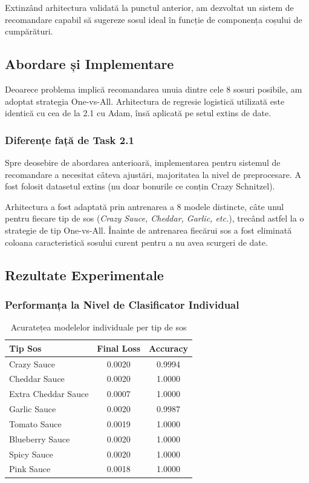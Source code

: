 \documentclass[12pt,a4paper]{article}
\begin{document}
Extinzând arhitectura validată la punctul anterior, am dezvoltat un sistem de recomandare capabil să sugereze sosul ideal în funcție de componența coșului de cumpărături.

\subsection{Abordare și Implementare}

Deoarece problema implică recomandarea unuia dintre cele 8 sosuri posibile, am adoptat strategia One-vs-All. Arhitectura de regresie logistică utilizată este identică cu cea de la 2.1 cu Adam, însă aplicată pe setul extins de date.

\subsubsection*{Diferențe față de Task 2.1}

Spre deosebire de abordarea anterioară, implementarea pentru sistemul de recomandare a necesitat câteva ajustări, majoritatea la nivel de preprocesare. A fost folosit datasetul extins (nu doar bonurile ce conțin Crazy Schnitzel).

Arhitectura a fost adaptată prin antrenarea a 8 modele distincte, câte unul pentru fiecare tip de sos (\textit{Crazy Sauce, Cheddar, Garlic, etc.}), trecând astfel la o strategie de tip One-vs-All. Înainte de antrenarea fiecărui sos a fost eliminată coloana caracteristică sosului curent pentru a nu avea scurgeri de date.

\subsection{Rezultate Experimentale}

\subsubsection*{Performanța la Nivel de Clasificator Individual}

\begin{table}[h]
    \centering
    \caption{Acuratețea modelelor individuale per tip de sos}
    \vspace{0.2cm}
    \begin{tabular}{lcc}
        \toprule
        \textbf{Tip Sos} & \textbf{Final Loss} & \textbf{Accuracy} \\
        \midrule
        Crazy Sauce & 0.0020 & 0.9994 \\
        Cheddar Sauce & 0.0020 & 1.0000 \\
        Extra Cheddar Sauce & 0.0007 & 1.0000 \\
        Garlic Sauce & 0.0020 & 0.9987 \\
        Tomato Sauce & 0.0019 & 1.0000 \\
        Blueberry Sauce & 0.0020 & 1.0000 \\
        Spicy Sauce & 0.0020 & 1.0000 \\
        Pink Sauce & 0.0018 & 1.0000 \\
        \bottomrule
    \end{tabular}
\end{table}
\end{document}
